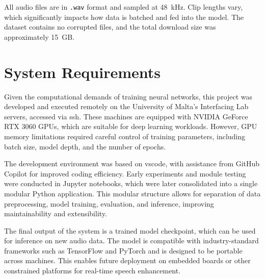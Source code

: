 All audio files are in \texttt{.wav} format and sampled at 48~kHz. Clip lengths vary, which significantly impacts how data is batched and fed into the model. The dataset contains no corrupted files, and the total download size was approximately 15~GB.

\section{System Requirements}
\label{sec:system_requirements}

Given the computational demands of training neural networks, this project was developed and executed remotely on the University of Malta’s Interfacing Lab servers, accessed via \gls{ssh}. These machines are equipped with NVIDIA GeForce RTX 3060 GPUs, which are suitable for deep learning workloads. However, GPU memory limitations required careful control of training parameters, including batch size, model depth, and the number of epochs.

The development environment was based on \gls{vscode}, with assistance from GitHub Copilot for improved coding efficiency. Early experiments and module testing were conducted in Jupyter notebooks, which were later consolidated into a single modular Python application. This modular structure allows for separation of data preprocessing, model training, evaluation, and inference, improving maintainability and extensibility.

The final output of the system is a trained model checkpoint, which can be used for inference on new audio data. The model is compatible with industry-standard frameworks such as TensorFlow and PyTorch and is designed to be portable across machines. This enables future deployment on embedded boards or other constrained platforms for real-time speech enhancement.

